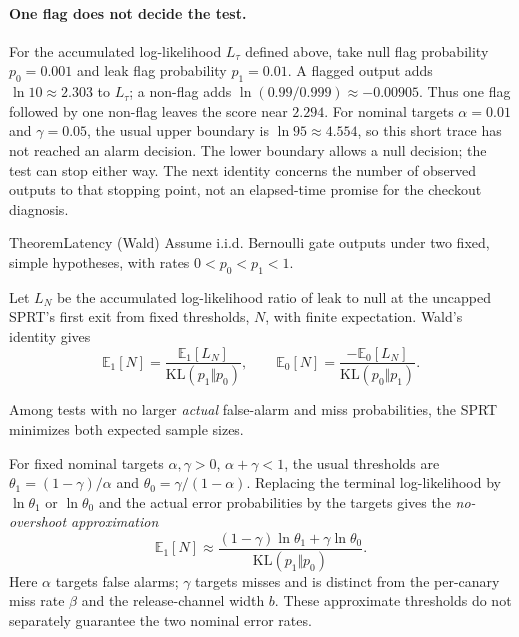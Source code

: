 \documentclass[11pt,a4paper]{article}
\theoremstyle{definition}
\begin{document}
\paragraph{One flag does not decide the test.}
For the accumulated log-likelihood $L_\tau$ defined above, take null flag
probability $p_0=0.001$ and leak flag probability $p_1=0.01$. A flagged output adds
$\ln10\approx2.303$ to $L_\tau$; a non-flag adds
$\ln(0.99/0.999)\approx-0.00905$. Thus one flag followed by one non-flag
leaves the score near $2.294$. For nominal targets $\alpha=0.01$ and
$\gamma=0.05$, the usual upper boundary is $\ln95\approx4.554$, so this
short trace has not reached an alarm decision. The lower boundary allows a
null decision; the test can stop either way. The next identity concerns the
number of observed outputs to that stopping point, not an elapsed-time
promise for the checkout diagnosis.

\begin{pdclaim}{Theorem}{Latency (Wald)}
\setlength{\parskip}{4pt plus 1pt}
\label{thm:sealed-latency}%
%
Assume i.i.d. Bernoulli gate outputs under two fixed, simple hypotheses,
with rates $0<p_0<p_1<1$.

Let $L_N$ be the accumulated log-likelihood ratio
of leak to null at the uncapped SPRT's first exit from fixed thresholds,
$N$, with finite expectation.
Wald's identity gives
\[
\mathbb{E}_1[N]=\frac{\mathbb{E}_1[L_N]}{\mathrm{KL}(p_1\Vert p_0)},
\qquad
\mathbb{E}_0[N]=\frac{-\mathbb{E}_0[L_N]}{\mathrm{KL}(p_0\Vert p_1)}.
\]

Among tests with no larger \emph{actual} false-alarm and miss probabilities,
the SPRT minimizes both expected sample sizes.
\end{pdclaim}

For fixed nominal targets $\alpha,\gamma>0$, $\alpha+\gamma<1$, the usual
thresholds are $\theta_1=(1-\gamma)/\alpha$ and $\theta_0=\gamma/(1-\alpha)$.
Replacing the terminal log-likelihood by $\ln \theta_1$ or $\ln \theta_0$ and the actual
error probabilities by the targets gives the \emph{no-overshoot approximation}
\[
\mathbb{E}_1[N]\approx
\frac{(1-\gamma)\ln \theta_1+\gamma\ln \theta_0}{\mathrm{KL}(p_1\Vert p_0)}.
\]
Here $\alpha$ targets false alarms; $\gamma$ targets misses and is distinct
from the per-canary miss rate $\beta$ and the
release-channel width $b$. These approximate thresholds do not separately
guarantee the two nominal error rates.
\end{document}
